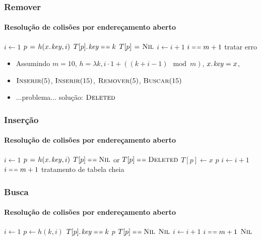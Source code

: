 \documentclass{beamer}
\begin{document}
\begin{frame}

\frametitle{Remover}
\framesubtitle{Resolução de colisões por endereçamento aberto}

\begin{codebox}
    \li $i \gets 1$
    \li \Repeat 
    \li   $p \gets h(\attrib{x}{key}, i)$ 
    \li   \If $\attrib{T[p]}{key} \isequal k$
    \li   \Then $T[p] \mathrel{\hspace{1pt}=\hspace{1pt}} \textnormal{\scshape Nil}$
    \li         \Return
          \End
    \li   $i \gets i+1$
          \End
    \li \Until $i \isequal m+1$
    \li \Comment tratar erro 
\end{codebox}

\pause

\begin{itemize}

\item Assumindo $m = 10$, $h = \lambda k, i \cdot 1 + ((k + i - 1) \mod m)$, $\attrib{x}{key} = x$,
\item $\textnormal{\scshape Inserir}(5)$, $\textnormal{\scshape Inserir}(15)$, $\textnormal{\scshape Remover}(5)$, $\textnormal{\scshape Buscar}(15)$
\pause
\item \alert{...problema...} \pause solução: $\textnormal{\scshape Deleted}$
\end{itemize}
\end{frame}

\begin{frame}

\frametitle{Inserção}
\framesubtitle{Resolução de colisões por endereçamento aberto}

\begin{codebox}
    \li $i \gets 1$
    \li \Repeat 
    \li   $p \gets h(\attrib{x}{key}, i)$ 
    \li   \If $T[p] \isequal \const{Nil}$ or $T[p] \isequal \const{Deleted}$
    \li   \Then $T[p] \gets x$
    \li     \Return $p$
    \li   \Else $i \gets i+1$
          \End
    \li \Until $i \isequal m+1$
    \li \Comment tratamento de tabela cheia
\end{codebox}

\end{frame}

\begin{frame}

\frametitle{Busca}
\framesubtitle{Resolução de colisões por endereçamento aberto}

\begin{codebox}
    \li $i \gets 1$
    \li \Repeat 
    \li   $p \gets h(k, i)$ 
    \li   \If $\attrib{T[p]}{key} \isequal k$
    \li   \Then \Return $p$
          \End
    \li   \If $T[p] \isequal \const{Nil}$
    \li   \Then \Return $\textnormal{\scshape Nil}$
          \End
    \li   $i \gets i+1$
          \End
    \li \Until $i \isequal m+1$
    \li \Return $\textnormal{\scshape Nil}$
\end{codebox}

\end{frame}
\end{document}
